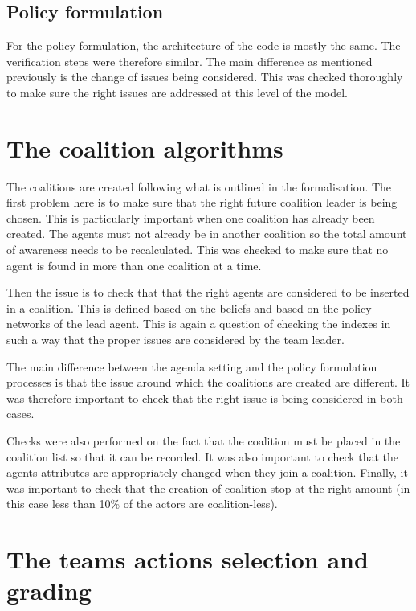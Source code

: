 \subsection{Policy formulation}

For the policy formulation, the architecture of the code is mostly the same. The verification steps were therefore similar. The main difference as mentioned previously is the change of issues being considered. This was checked thoroughly to make sure the right issues are addressed at this level of the model.

\section{The coalition algorithms}

The coalitions are created following what is outlined in the formalisation.  The first problem here is to make sure that the right future coalition leader is being chosen. This is particularly important when one coalition has already been created. The agents must not already be in another coalition so the total amount of awareness needs to be recalculated. This was checked to make sure that no agent is found in more than one coalition at a time.

Then the issue is to check that that the right agents are considered to be inserted in a coalition. This is defined based on the beliefs and based on the policy networks of the lead agent. This is again a question of checking the indexes in such a way that the proper issues are considered by the team leader.

The main difference between the agenda setting and the policy formulation processes is that the issue around which the coalitions are created are different. It was therefore important to check that the right issue is being considered in both cases.

Checks were also performed on the fact that the coalition must be placed in the coalition list so that it can be recorded. It was also important to check that the agents attributes are appropriately changed when they join a coalition. Finally, it was important to check that the creation of coalition stop at the right amount (in this case less than 10\% of the actors are coalition-less).

\section{The teams actions selection and grading}

